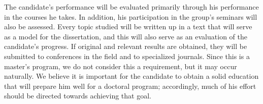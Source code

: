 \documentclass[12pt]{article}
\begin{document}
The candidate's performance will be evaluated primarily through his performance in the courses he takes. In addition, his participation in the group's seminars will also be assessed. 
Every topic studied will be written up in a text that will serve as a model for the dissertation, and this will also serve as an evaluation of the candidate's progress. 
If original and relevant results are obtained, they will be submitted to conferences in the field and to specialized journals. 
Since this is a master’s program, we do not consider this a requirement, but it may occur naturally. 
We believe it is important for the candidate to obtain a solid education that will prepare him well for a doctoral program; accordingly, much of his effort should be directed towards achieving that goal.





\end{document}
